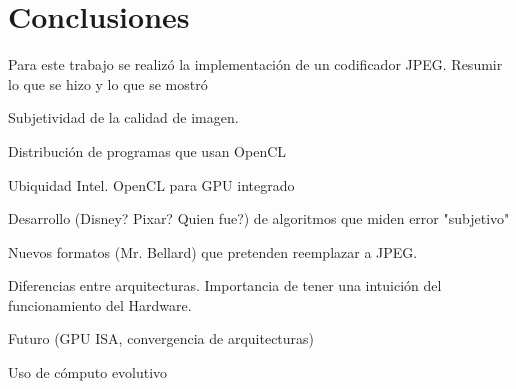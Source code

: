 
\chapter{Conclusiones}\label{ch:conclusiones}

Para este trabajo se realizó la implementación de un codificador JPEG.
Resumir lo que se hizo y lo que se mostró

Subjetividad de la calidad de imagen.

Distribución de programas que usan OpenCL

Ubiquidad Intel. OpenCL para GPU integrado

Desarrollo (Disney? Pixar? Quien fue?) de algoritmos que miden error "subjetivo"

Nuevos formatos (Mr. Bellard) que pretenden reemplazar a JPEG.

Diferencias entre arquitecturas. Importancia de tener una intuición del funcionamiento del Hardware.

Futuro (GPU ISA, convergencia de arquitecturas)

Uso de cómputo evolutivo
